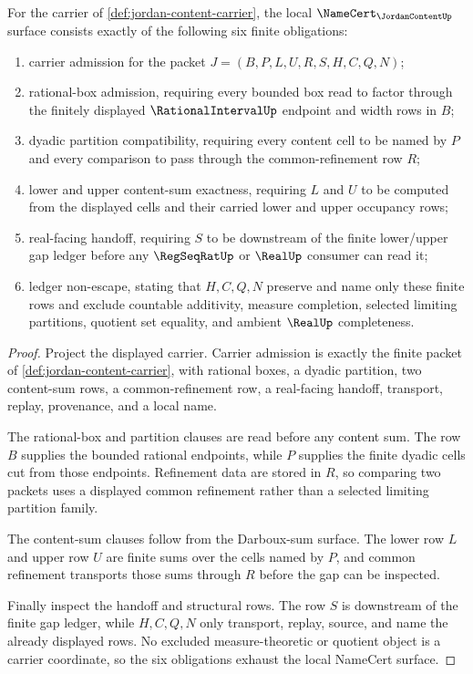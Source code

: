 \begin{theorem}
\label{thm:jordan-content-namecert-obligations}
For the carrier of \autoref{def:jordan-content-carrier}, the local $\NameCert_{\JordanContentUp}$ surface consists exactly of the following six finite obligations:
\begin{enumerate}
\item carrier admission for the packet $J=(B,P,L,U,R,S,H,C,Q,N)$;
\item rational-box admission, requiring every bounded box read to factor through the finitely displayed $\RationalIntervalUp$ endpoint and width rows in $B$;
\item dyadic partition compatibility, requiring every content cell to be named by $P$ and every comparison to pass through the common-refinement row $R$;
\item lower and upper content-sum exactness, requiring $L$ and $U$ to be computed from the displayed cells and their carried lower and upper occupancy rows;
\item real-facing handoff, requiring $S$ to be downstream of the finite lower/upper gap ledger before any $\RegSeqRatUp$ or $\RealUp$ consumer can read it;
\item ledger non-escape, stating that $H,C,Q,N$ preserve and name only these finite rows and exclude countable additivity, measure completion, selected limiting partitions, quotient set equality, and ambient $\RealUp$ completeness.
\end{enumerate}
\end{theorem}
\begin{proof}
Project the displayed carrier. Carrier admission is exactly the finite packet of \autoref{def:jordan-content-carrier}, with rational boxes, a dyadic partition, two content-sum rows, a common-refinement row, a real-facing handoff, transport, replay, provenance, and a local name.

The rational-box and partition clauses are read before any content sum. The row $B$ supplies the bounded rational endpoints, while $P$ supplies the finite dyadic cells cut from those endpoints. Refinement data are stored in $R$, so comparing two packets uses a displayed common refinement rather than a selected limiting partition family.

The content-sum clauses follow from the Darboux-sum surface. The lower row $L$ and upper row $U$ are finite sums over the cells named by $P$, and common refinement transports those sums through $R$ before the gap can be inspected.

Finally inspect the handoff and structural rows. The row $S$ is downstream of the finite gap ledger, while $H,C,Q,N$ only transport, replay, source, and name the already displayed rows. No excluded measure-theoretic or quotient object is a carrier coordinate, so the six obligations exhaust the local NameCert surface.
\end{proof}

